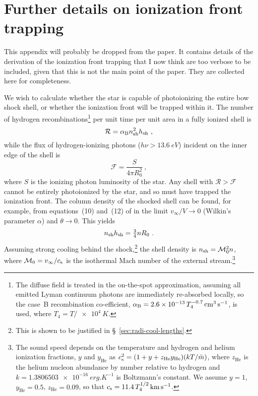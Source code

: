 
\section{Further details on ionization front trapping}
\label{sec:furth-deta-ioniz}

This appendix will probably be dropped from the paper.  It contains
details of the derivation of the ionization front trapping that I now
think are too verbose to be included, given that this is not the main
point of the paper.  They are collected here for completeness.

We wish to calculate whether the star is capable of photoionizing the
entire bow shock shell, or whether the ionization front will be
trapped within it.  The number of hydrogen recombinations\footnote{%
  The diffuse field is treated in the on-the-spot approximation,
  assuming all emitted Lyman continuum photons are immediately
  re-absorbed locally, so the case~B recombination co-efficient,
  \(\alphaB = \num{2.6e-13}\, T_4^{-0.7}\, \si{cm^3.s^{-1}}\), is
  used, where \(T_4 = T/\SI{e4}{K}\).} %
per unit time per unit area in a fully ionized shell is
\begin{equation}
  \label{eq:shell-recombination-rate-app}
  \mathcal{R} = \alphaB n\shell^2 h\shell \ ,
\end{equation}
while the flux of hydrogen-ionizing photons
(\(h \nu > \SI{13.6}{eV}\)) incident on the inner edge of the shell is
\begin{equation}
  \label{eq:shell-ionizing-flux-app}
  \mathcal{F} = \frac{S} {4 \pi R_0^2} \ , 
\end{equation}
where \(S\) is the ionizing photon luminosity of the star.  Any shell
with \(\mathcal{R} > \mathcal{F}\) cannot be entirely photoionized by
the star, and so must have trapped the ionization front.  The column
density of the shocked shell can be found, for example, from
equations~(10) and~(12) of \citet{Wilkin:1996a} in the limit
\(v_\infty/V \to 0\) (Wilkin's parameter \(\alpha\)) and \(\theta \to 0\).  This yields
\begin{equation}
  \label{eq:shocked-shell-column-app}
  n\shell h\shell = \tfrac34 n R_0 \ .
\end{equation}
Assuming strong cooling behind the shock,\footnote{%
  This is shown to be justified in \S~\ref{sec:radi-cool-lengths}.
} %
the shell density is \(n\shell = \mathcal{M}_0^2 n\), where
\(\mathcal{M}_0 = v_\infty / \sound\) is the isothermal Mach number of the
external stream.\footnote{%
  \label{fn:temperature-dependence}
  The sound speed depends on the temperature and hydrogen and helium
  ionization fractions, \(y\) and \(y_{\text{He}}\) as
  \(\sound^2 = (1 + y + z_{\text{He}} y_{\text{He}}) (k T /
  \bar{m})\), where \(z_{\text{He}}\) is the helium nucleon abundance
  by number relative to hydrogen and
  \(k = \SI{1.3806503e-16}{erg.K^{-1}}\) is Boltzmann's constant.  We
  assume \(y = 1\), \(y_{\text{He}} = 0.5\), \(z_{\text{He}} = 0.09\),
  so that \(\sound = \num{11.4}\, T_4^{1/2}\, \si{km.s^{-1}}\). } %
